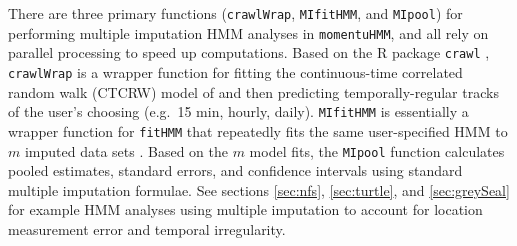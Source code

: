 \documentclass[12pt]{article}\usepackage[]{graphicx}\usepackage[]{color}
\begin{document}
There are three primary functions (\verb|crawlWrap|, \verb|MIfitHMM|, and \verb|MIpool|) for performing multiple imputation HMM analyses in \verb|momentuHMM|, and all rely on parallel processing to speed up computations. Based on the R package \verb|crawl| \citep{Johnson2017}, \verb|crawlWrap| is a wrapper function for fitting the continuous-time correlated random walk (CTCRW) model of \cite{JohnsonEtAl2008} and then predicting temporally-regular tracks of the user's choosing (e.g.\ 15 min, hourly, daily). %
\verb|MIfitHMM| is essentially a wrapper function for \verb|fitHMM| that repeatedly fits the same user-specified HMM to $m$ imputed data sets%
. Based on the $m$ model fits, the \verb|MIpool| function calculates pooled estimates, standard errors, and confidence intervals %
using standard multiple imputation formulae. %
See sections \ref{sec:nfs}, \ref{sec:turtle}, and \ref{sec:greySeal} for example HMM analyses using multiple imputation to account for location measurement error and temporal irregularity.
\end{document}
